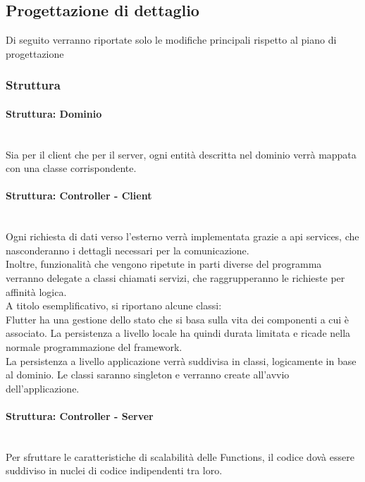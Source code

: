 \newpage
\subsection{Progettazione di dettaglio}

Di seguito verranno riportate solo le modifiche principali rispetto al piano di progettazione
\subsubsection{Struttura}

\paragraph{Struttura: Dominio}\mbox{}\\

Sia per il client che per il server, ogni entità descritta nel dominio verrà mappata con una classe corrispondente.

\paragraph{Struttura: Controller - Client}\mbox{}\\
Ogni richiesta di dati verso l'esterno verrà implementata grazie a api services, che nasconderanno i dettagli necessari per la comunicazione.\\
Inoltre, funzionalità che vengono ripetute in parti diverse del programma verranno delegate a classi chiamati servizi, che raggrupperanno le richieste per affinità logica.\\
A titolo esemplificativo, si riportano alcune classi:\\
Flutter ha una gestione dello stato che si basa sulla vita dei componenti a cui è associato. La persistenza a livello locale ha quindi durata limitata e ricade nella normale programmazione del framework.\\
La persistenza a livello applicazione verrà suddivisa in classi, logicamente in base al dominio. Le classi saranno singleton e verranno create all'avvio dell'applicazione.\\
\paragraph{Struttura: Controller - Server}\mbox{}\\
Per sfruttare le caratteristiche di scalabilità delle Functions, il codice dovà essere suddiviso in nuclei di codice indipendenti tra loro.

